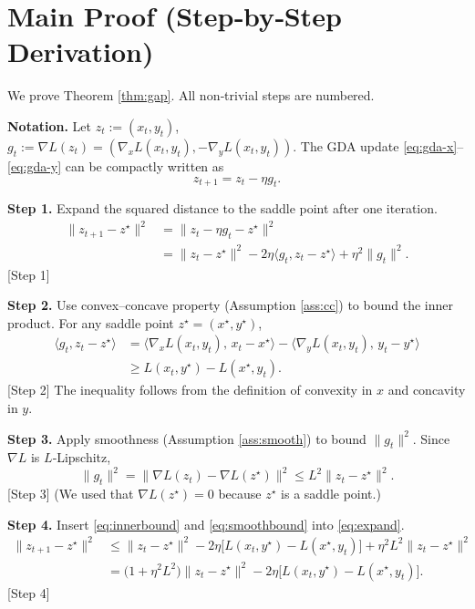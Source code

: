 \documentclass{article}
\begin{document}
\section*{Main Proof (Step‑by‑Step Derivation)}
We prove Theorem \ref{thm:gap}.  All non‑trivial steps are numbered.

\bigskip
\noindent\textbf{Notation.}
Let $z_{t}:=(x_{t},y_{t})$, $g_{t}:=\nabla L(z_{t})=(\nabla_{x}L(x_{t},y_{t}),-\nabla_{y}L(x_{t},y_{t}))$.
The GDA update \eqref{eq:gda-x}–\eqref{eq:gda-y} can be compactly written as
\begin{equation}
z_{t+1}=z_{t}-\eta g_{t}. \label{eq:update-compact}
\end{equation}

\bigskip
\noindent\textbf{Step 1.} Expand the squared distance to the saddle point after one iteration.
\begin{align}
\|z_{t+1}-z^{\star}\|^{2}
&=\|z_{t}-\eta g_{t}-z^{\star}\|^{2} \nonumber\\
&=\|z_{t}-z^{\star}\|^{2}-2\eta\langle g_{t},z_{t}-z^{\star}\rangle+\eta^{2}\|g_{t}\|^{2}. \label{eq:expand}
\end{align}
[Step 1]

\bigskip
\noindent\textbf{Step 2.} Use convex–concave property (Assumption \ref{ass:cc}) to bound the inner product.
For any saddle point $z^{\star}=(x^{\star},y^{\star})$,
\begin{align}
\langle g_{t},z_{t}-z^{\star}\rangle
&=\langle \nabla_{x}L(x_{t},y_{t}),\,x_{t}-x^{\star}\rangle
   -\langle \nabla_{y}L(x_{t},y_{t}),\,y_{t}-y^{\star}\rangle \nonumber\\
&\ge L(x_{t},y^{\star})-L(x^{\star},y_{t}). \label{eq:innerbound}
\end{align}
[Step 2] The inequality follows from the definition of convexity in $x$ and concavity in $y$.

\bigskip
\noindent\textbf{Step 3.} Apply smoothness (Assumption \ref{ass:smooth}) to bound $\|g_{t}\|^{2}$.
Since $\nabla L$ is $L$‑Lipschitz,
\[
\|g_{t}\|^{2}= \|\nabla L(z_{t})-\nabla L(z^{\star})\|^{2}
\le L^{2}\|z_{t}-z^{\star}\|^{2}. \label{eq:smoothbound}
\]
[Step 3] (We used that $\nabla L(z^{\star})=0$ because $z^{\star}$ is a saddle point.)

\bigskip
\noindent\textbf{Step 4.} Insert \eqref{eq:innerbound} and \eqref{eq:smoothbound} into \eqref{eq:expand}.
\begin{align}
\|z_{t+1}-z^{\star}\|^{2}
&\le \|z_{t}-z^{\star}\|^{2}
      -2\eta\bigl[L(x_{t},y^{\star})-L(x^{\star},y_{t})\bigr]
      +\eta^{2}L^{2}\|z_{t}-z^{\star}\|^{2} \nonumber\\
&= \bigl(1+\eta^{2}L^{2}\bigr)\|z_{t}-z^{\star}\|^{2}
   -2\eta\bigl[L(x_{t},y^{\star})-L(x^{\star},y_{t})\bigr]. \label{eq:pre-sum}
\end{align}
[Step 4]
\end{document}
